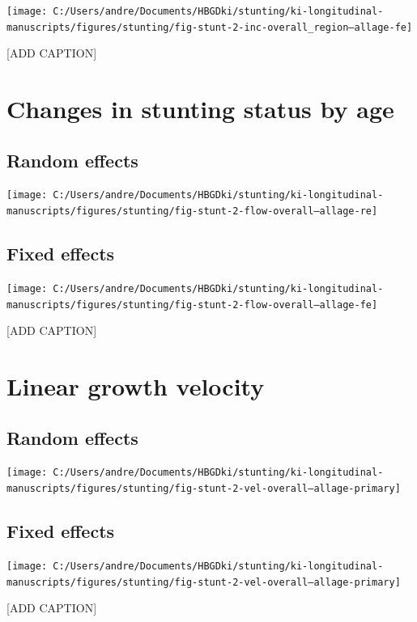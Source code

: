 \documentclass[9pt,]{book}
\begin{document}
\texttt{[image: C:/Users/andre/Documents/HBGDki/stunting/ki-longitudinal-manuscripts/figures/stunting/fig-stunt-2-inc-overall\_region--allage-fe]}

{[}ADD CAPTION{]}

\section{Changes in stunting status by
age}\label{changes-in-stunting-status-by-age}

\subsection{Random effects}\label{random-effects-2}

\texttt{[image: C:/Users/andre/Documents/HBGDki/stunting/ki-longitudinal-manuscripts/figures/stunting/fig-stunt-2-flow-overall--allage-re]}

\subsection{Fixed effects}\label{fixed-effects-2}

\texttt{[image: C:/Users/andre/Documents/HBGDki/stunting/ki-longitudinal-manuscripts/figures/stunting/fig-stunt-2-flow-overall--allage-fe]}

{[}ADD CAPTION{]}

\section{Linear growth velocity}\label{linear-growth-velocity-1}

\subsection{Random effects}\label{random-effects-3}

\texttt{[image: C:/Users/andre/Documents/HBGDki/stunting/ki-longitudinal-manuscripts/figures/stunting/fig-stunt-2-vel-overall--allage-primary]}

\subsection{Fixed effects}\label{fixed-effects-3}

\texttt{[image: C:/Users/andre/Documents/HBGDki/stunting/ki-longitudinal-manuscripts/figures/stunting/fig-stunt-2-vel-overall--allage-primary]}

{[}ADD CAPTION{]}


\end{document}
